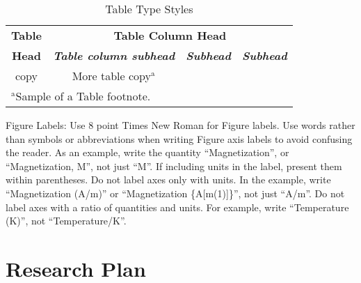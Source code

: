 \documentclass[conference]{IEEEtran}
\begin{document}
\begin{table}[htbp]
\caption{Table Type Styles}
\begin{center}
\begin{tabular}{|c|c|c|c|}
\hline
\textbf{Table}&\multicolumn{3}{|c|}{\textbf{Table Column Head}} \\
\cline{2-4} 
\textbf{Head} & \textbf{\textit{Table column subhead}}& \textbf{\textit{Subhead}}& \textbf{\textit{Subhead}} \\
\hline
copy& More table copy$^{\mathrm{a}}$& &  \\
\hline
\multicolumn{4}{l}{$^{\mathrm{a}}$Sample of a Table footnote.}
\end{tabular}
\label{tab1}
\end{center}
\end{table}



Figure Labels: Use 8 point Times New Roman for Figure labels. Use words 
rather than symbols or abbreviations when writing Figure axis labels to 
avoid confusing the reader. As an example, write the quantity 
``Magnetization'', or ``Magnetization, M'', not just ``M''. If including 
units in the label, present them within parentheses. Do not label axes only 
with units. In the example, write ``Magnetization (A/m)'' or ``Magnetization 
\{A[m(1)]\}'', not just ``A/m''. Do not label axes with a ratio of 
quantities and units. For example, write ``Temperature (K)'', not 
``Temperature/K''.

\section*{Research Plan}
\end{document}
